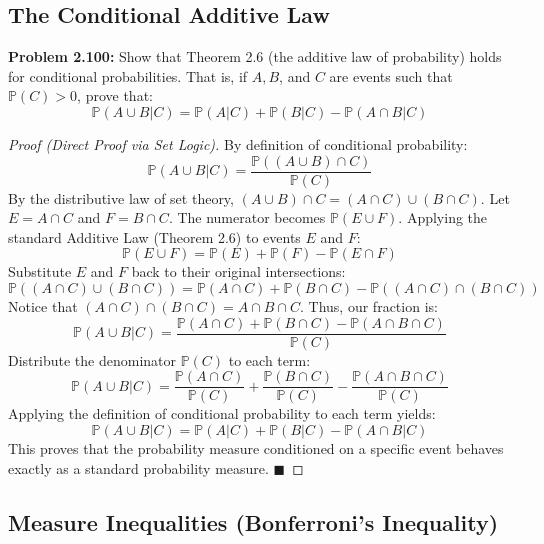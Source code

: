 \documentclass[12pt]{article}
\theoremstyle{definition}
\theoremstyle{remark}
\begin{document}
\subsection{The Conditional Additive Law}

\textbf{Problem 2.100:} Show that Theorem 2.6 (the additive law of probability) holds for conditional probabilities. That is, if $A, B$, and $C$ are events such that $\mathbb{P}(C) > 0$, prove that:
\[ \mathbb{P}(A \cup B | C) = \mathbb{P}(A|C) + \mathbb{P}(B|C) - \mathbb{P}(A \cap B | C) \]
\begin{proof}[Proof (Direct Proof via Set Logic)]
By definition of conditional probability:
\[ \mathbb{P}(A \cup B | C) = \frac{\mathbb{P}((A \cup B) \cap C)}{\mathbb{P}(C)} \]
By the distributive law of set theory, $(A \cup B) \cap C = (A \cap C) \cup (B \cap C)$. Let $E = A \cap C$ and $F = B \cap C$. The numerator becomes $\mathbb{P}(E \cup F)$. 
Applying the standard Additive Law (Theorem 2.6) to events $E$ and $F$:
\[ \mathbb{P}(E \cup F) = \mathbb{P}(E) + \mathbb{P}(F) - \mathbb{P}(E \cap F) \]
Substitute $E$ and $F$ back to their original intersections:
\[ \mathbb{P}((A \cap C) \cup (B \cap C)) = \mathbb{P}(A \cap C) + \mathbb{P}(B \cap C) - \mathbb{P}((A \cap C) \cap (B \cap C)) \]
Notice that $(A \cap C) \cap (B \cap C) = A \cap B \cap C$. Thus, our fraction is:
\[ \mathbb{P}(A \cup B | C) = \frac{\mathbb{P}(A \cap C) + \mathbb{P}(B \cap C) - \mathbb{P}(A \cap B \cap C)}{\mathbb{P}(C)} \]
Distribute the denominator $\mathbb{P}(C)$ to each term:
\[ \mathbb{P}(A \cup B | C) = \frac{\mathbb{P}(A \cap C)}{\mathbb{P}(C)} + \frac{\mathbb{P}(B \cap C)}{\mathbb{P}(C)} - \frac{\mathbb{P}(A \cap B \cap C)}{\mathbb{P}(C)} \]
Applying the definition of conditional probability to each term yields:
\[ \mathbb{P}(A \cup B | C) = \mathbb{P}(A|C) + \mathbb{P}(B|C) - \mathbb{P}(A \cap B | C) \]
This proves that the probability measure conditioned on a specific event behaves exactly as a standard probability measure. $\blacksquare$
\end{proof}

\subsection{Measure Inequalities (Bonferroni's Inequality)}
\end{document}
